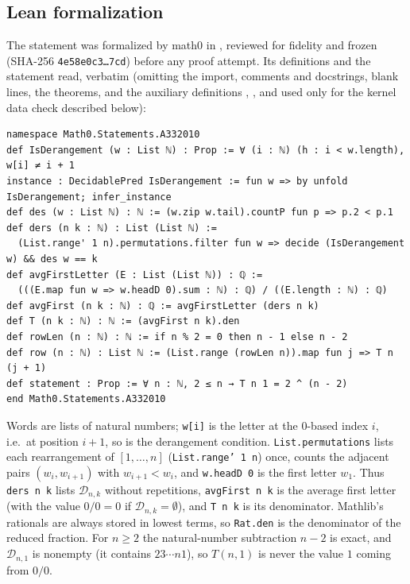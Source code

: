 \documentclass[11pt]{amsart}
\theoremstyle{plain}
\theoremstyle{definition}
\newcommand{\cD}{\mathcal{D}}
\begin{document}
\subsection*{Lean formalization}
The statement was formalized by math0 in , reviewed for fidelity and frozen (SHA-256 \texttt{4e58e0c3\ldots 7cd}) before any proof attempt. Its definitions and the statement read, verbatim (omitting the import, comments and docstrings, blank lines, the theorems, and the auxiliary definitions , ,  and  used only for the kernel data check described below):
\begin{lstlisting}
namespace Math0.Statements.A332010
def IsDerangement (w : List ℕ) : Prop := ∀ (i : ℕ) (h : i < w.length), w[i] ≠ i + 1
instance : DecidablePred IsDerangement := fun w => by unfold IsDerangement; infer_instance
def des (w : List ℕ) : ℕ := (w.zip w.tail).countP fun p => p.2 < p.1
def ders (n k : ℕ) : List (List ℕ) :=
  (List.range' 1 n).permutations.filter fun w => decide (IsDerangement w) && des w == k
def avgFirstLetter (E : List (List ℕ)) : ℚ :=
  (((E.map fun w => w.headD 0).sum : ℕ) : ℚ) / ((E.length : ℕ) : ℚ)
def avgFirst (n k : ℕ) : ℚ := avgFirstLetter (ders n k)
def T (n k : ℕ) : ℕ := (avgFirst n k).den
def rowLen (n : ℕ) : ℕ := if n % 2 = 0 then n - 1 else n - 2
def row (n : ℕ) : List ℕ := (List.range (rowLen n)).map fun j => T n (j + 1)
def statement : Prop := ∀ n : ℕ, 2 ≤ n → T n 1 = 2 ^ (n - 2)
end Math0.Statements.A332010
\end{lstlisting}
Words are lists of natural numbers; \texttt{w[i]} is the letter at the $0$-based index $i$, i.e.\ at position $i+1$, so  is the derangement condition. \texttt{List.permutations} lists each rearrangement of $[1,\dots,n]$ (\texttt{List.range' 1 n}) once,  counts the adjacent pairs $(w_i,w_{i+1})$ with $w_{i+1}<w_i$, and \texttt{w.headD 0} is the first letter $w_1$. Thus \texttt{ders n k} lists $\cD_{n,k}$ without repetitions, \texttt{avgFirst n k} is the average first letter (with the value $0/0=0$ if $\cD_{n,k}=\emptyset$), and \texttt{T n k} is its denominator. Mathlib's rationals are always stored in lowest terms, so \texttt{Rat.den} is the denominator of the reduced fraction. For $n\ge2$ the natural-number subtraction $n-2$ is exact, and $\cD_{n,1}$ is nonempty (it contains $23\cdots n1$), so $T(n,1)$ is never the value $1$ coming from $0/0$.
\end{document}
